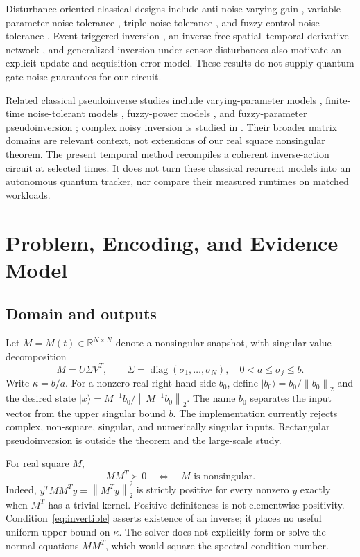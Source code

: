 \documentclass[journal]{IEEEtran}
\newcommand{\norm}[1]{\left\lVert#1\right\rVert}
\newcommand{\ket}[1]{\lvert#1\rangle}
\newcommand{\R}{\mathbb{R}}
\begin{document}
Disturbance-oriented classical designs include anti-noise varying gain
\cite{exponential2020}, variable-parameter noise tolerance \cite{variable2022},
triple noise tolerance \cite{triple2024}, and fuzzy-control noise tolerance
\cite{intensive2023}. Event-triggered inversion \cite{event2023}, an
inverse-free spatial--temporal derivative network \cite{hybridderivative2025},
and generalized inversion under sensor disturbances \cite{lowcomplexity2026}
also motivate an explicit update and acquisition-error model. These results
do not supply quantum gate-noise guarantees for our circuit.

Related classical pseudoinverse studies include varying-parameter models
\cite{varying2020}, finite-time noise-tolerant models \cite{noisefinite2020},
fuzzy-power models \cite{fuzzypower2021}, and fuzzy-parameter pseudoinversion
\cite{fuzzyparameter2022}; complex noisy inversion is studied in
\cite{complexnoise2020}. Their broader matrix domains are relevant context,
not extensions of our real square nonsingular theorem. The present temporal
method recompiles a coherent inverse-action circuit at selected times.
It does not turn these classical recurrent models into an autonomous
quantum tracker, nor compare their measured runtimes on matched workloads.

\section{Problem, Encoding, and Evidence Model}
\subsection{Domain and outputs}
Let $M=M(t)\in\R^{N\times N}$ denote a nonsingular snapshot, with
singular-value decomposition
\begin{equation}
 M=U\Sigma V^T,\qquad
 \Sigma=\operatorname{diag}(\sigma_1,\ldots,\sigma_N),
 \quad 0<a\leq\sigma_j\leq b.
 \label{eq:svd}
\end{equation}
Write $\kappa=b/a$. For a nonzero real right-hand side $b_0$, define
$\ket{b_0}=b_0/\norm{b_0}_2$ and the desired state
$\ket{x}=M^{-1}b_0/\norm{M^{-1}b_0}_2$. The name $b_0$ separates the input
vector from the upper singular bound $b$. The implementation currently
rejects complex, non-square, singular, and numerically singular inputs.
Rectangular pseudoinversion is outside the theorem and the large-scale study.

For real square $M$,
\begin{equation}
 MM^T\succ0\quad\Longleftrightarrow\quad M\text{ is nonsingular}.
 \label{eq:invertible}
\end{equation}
Indeed, $y^TMM^Ty=\norm{M^Ty}_2^2$ is strictly positive for every nonzero
$y$ exactly when $M^T$ has a trivial kernel. Positive definiteness is not
elementwise positivity. Condition~\eqref{eq:invertible} asserts existence of
an inverse; it places no useful uniform upper bound on $\kappa$. The solver
does not explicitly form or solve the normal equations $MM^T$, which would
square the spectral condition number.
\end{document}
